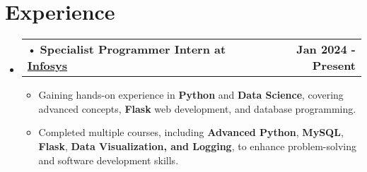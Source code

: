 \documentclass[letterpaper,11pt]{article}
\makeatletter
\newcommand{\resumeItem}[1]{
  \item\small{
	{#1 \vspace{-2pt}}
  }
}
\newcommand{\resumeProjectHeading}[2]{
	\item
	\begin{tabular*}{1.001\textwidth}{l@{\extracolsep{\fill}}r}
  	\small#1 & \textbf{\small #2}\\
	\end{tabular*}\vspace{-7pt}
}
\newcommand{\resumeSubHeadingListStart}{\begin{itemize}[leftmargin=0.0in, label={}]}
\newcommand{\resumeSubHeadingListEnd}{\end{itemize}}
\newcommand{\resumeItemListStart}{\begin{itemize}}
\newcommand{\resumeItemListEnd}{\end{itemize}\vspace{-5pt}}
\makeatother
\begin{document}
 
\section{Experience }
\begin{itemize}[leftmargin=0.12in, label={}]
    \vspace{-12pt}
    \resumeSubHeadingListStart

      \resumeProjectHeading
       {\hspace{-5pt}• { \textbf{Specialist Programmer Intern at \href{https://www.infosys.com/}{Infosys}} }  }{Jan 2024 - Present}
        \resumeItemListStart
             \vspace{5pt}
            \resumeItem{ Gaining hands-on experience in \textbf{Python} and \textbf{Data Science}, covering advanced concepts, \textbf{Flask} web development, and database programming.}
             \vspace{4pt}
             
            \resumeItem{ Completed multiple courses, including \textbf{Advanced Python}, \textbf{MySQL}, \textbf{Flask}, \textbf{Data Visualization, and Logging}, to enhance problem-solving and software development skills.}
        \resumeItemListEnd
        \vspace{-4pt}
    \resumeSubHeadingListEnd
 \end{itemize} 
\vspace{-6pt}




\end{document}

